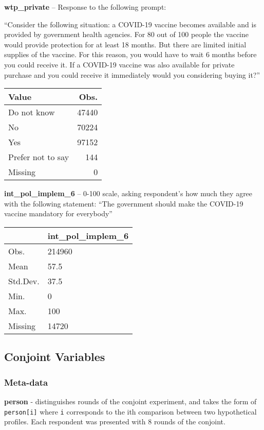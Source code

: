 \documentclass[
]{article}
\begin{document}
\newpage

\textbf{wtp\_private} -- Response to the following prompt:

``Consider the following situation: a COVID-19 vaccine becomes available
and is provided by government health agencies. For 80 out of 100 people
the vaccine would provide protection for at least 18 months. But there
are limited initial supplies of the vaccine. For this reason, you would
have to wait 6 months before you could receive it. If a COVID-19 vaccine
was also available for private purchase and you could receive it
immediately would you considering buying it?''

\begin{longtable}[]{@{}lr@{}}
\toprule
Value & Obs.\tabularnewline
\midrule
\endhead
Do not know & 47440\tabularnewline
No & 70224\tabularnewline
Yes & 97152\tabularnewline
Prefer not to say & 144\tabularnewline
Missing & 0\tabularnewline
\bottomrule
\end{longtable}

\textbf{int\_pol\_implem\_6} -- 0-100 scale, asking respondent's how
much they agree with the following statement: ``The government should
make the COVID-19 vaccine mandatory for everybody''

\begin{longtable}[]{@{}ll@{}}
\toprule
& int\_pol\_implem\_6\tabularnewline
\midrule
\endhead
Obs. & 214960\tabularnewline
Mean & 57.5\tabularnewline
Std.Dev. & 37.5\tabularnewline
Min. & 0\tabularnewline
Max. & 100\tabularnewline
Missing & 14720\tabularnewline
\bottomrule
\end{longtable}

\newpage

\hypertarget{conjoint-variables}{%
\subsection{Conjoint Variables}\label{conjoint-variables}}

\hypertarget{meta-data}{%
\subsubsection{Meta-data}\label{meta-data}}

\textbf{person} - distinguishes rounds of the conjoint experiment, and
takes the form of \texttt{person{[}i{]}} where \texttt{i} corresponds to
the ith comparison between two hypothetical profiles. Each respondent
was presented with 8 rounds of the conjoint.
\end{document}
